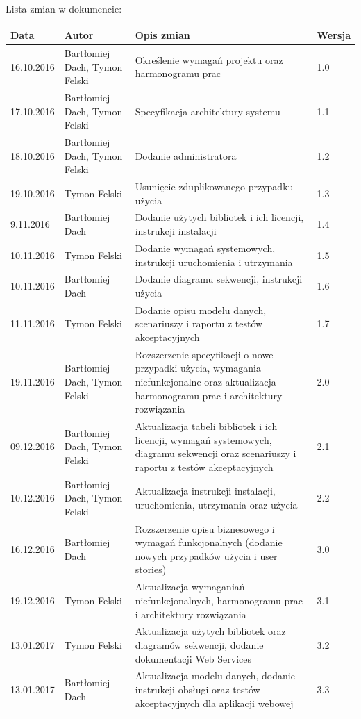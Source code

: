 \documentclass[10pt,a4paper]{article}
\begin{document}
\noindent
Lista zmian w dokumencie:
\begin{table}[H]
\def\arraystretch{1.5}
\begin{tabularx}{\textwidth}{|l|l|X|l|}
	\hline
	\textbf{Data} & \textbf{Autor} & \textbf{Opis zmian} & \textbf{Wersja} \\
	\hline
	16.10.2016 & Bartłomiej Dach, Tymon Felski & Określenie wymagań projektu oraz harmonogramu prac & 1.0 \\
	\hline
	17.10.2016 & Bartłomiej Dach, Tymon Felski & Specyfikacja architektury systemu & 1.1 \\
	\hline
	18.10.2016 & Bartłomiej Dach, Tymon Felski & Dodanie administratora & 1.2 \\
	\hline
	19.10.2016 & Tymon Felski & Usunięcie zduplikowanego przypadku użycia & 1.3 \\
	\hline
	9.11.2016 & Bartłomiej Dach & Dodanie użytych bibliotek i ich licencji, instrukcji instalacji & 1.4 \\
	\hline
	10.11.2016 & Tymon Felski & Dodanie wymagań systemowych, instrukcji uruchomienia i utrzymania & 1.5 \\
	\hline
	10.11.2016 & Bartłomiej Dach & Dodanie diagramu sekwencji, instrukcji użycia & 1.6 \\
	\hline
	11.11.2016 & Tymon Felski & Dodanie opisu modelu danych, scenariuszy i raportu z testów akceptacyjnych & 1.7 \\
	\hline
	19.11.2016 & Bartłomiej Dach, Tymon Felski & Rozszerzenie specyfikacji o nowe przypadki użycia, wymagania niefunkcjonalne oraz aktualizacja harmonogramu prac i architektury rozwiązania & 2.0 \\
	\hline
	09.12.2016 & Bartłomiej Dach, Tymon Felski & Aktualizacja tabeli bibliotek i ich licencji, wymagań systemowych, diagramu sekwencji oraz scenariuszy i raportu z testów akceptacyjnych & 2.1 \\
	\hline
	10.12.2016 & Bartłomiej Dach, Tymon Felski & Aktualizacja instrukcji instalacji, uruchomienia, utrzymania oraz użycia & 2.2 \\
	\hline
	16.12.2016 & Bartłomiej Dach & Rozszerzenie opisu biznesowego i wymagań funkcjonalnych (dodanie nowych przypadków użycia i user stories) & 3.0 \\
	\hline
	19.12.2016 & Tymon Felski & Aktualizacja wymaganiań niefunkcjonalnych, harmonogramu prac i architektury rozwiązania & 3.1 \\
	\hline
	13.01.2017 & Tymon Felski & Aktualizacja użytych bibliotek oraz diagramów sekwencji, dodanie dokumentacji Web Services & 3.2 \\
	\hline
	13.01.2017 & Bartłomiej Dach & Aktualizacja modelu danych, dodanie instrukcji obsługi oraz testów akceptacyjnych dla aplikacji webowej & 3.3 \\
	\hline
\end{tabularx}
\end{table}
\end{document}
